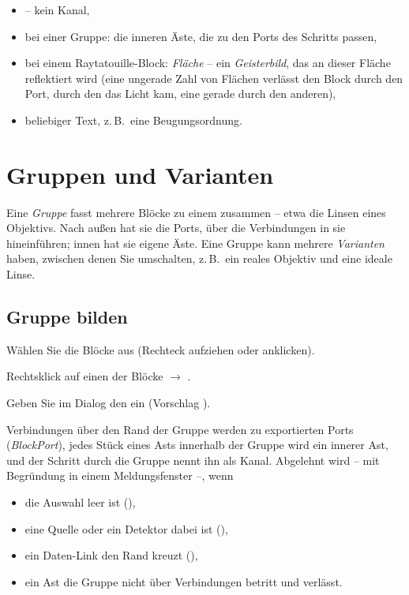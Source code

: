 \begin{itemize}
  \item {} – kein Kanal,
  \item bei einer Gruppe: die inneren Äste, die zu den Ports des Schritts passen,
  \item bei einem Raytatouille-Block: \textit{Fläche} – ein \emph{Geisterbild},
        das an dieser Fläche reflektiert wird (eine ungerade Zahl von Flächen verlässt den Block
        durch den Port, durch den das Licht kam, eine gerade durch den anderen),
  \item beliebiger Text, z.\,B.\ eine Beugungsordnung.
\end{itemize}

\section{Gruppen und Varianten}\label{sec:workflow-gruppen}

Eine \emph{Gruppe} fasst mehrere Blöcke zu einem zusammen – etwa die Linsen eines Objektivs. Nach
außen hat sie die Ports, über die Verbindungen in sie hineinführen; innen hat sie eigene Äste.
Eine Gruppe kann mehrere \emph{Varianten} haben, zwischen denen Sie umschalten, z.\,B.\ ein
reales Objektiv und eine ideale Linse.

\subsection{Gruppe bilden}

\begin{schritte}
  \item Wählen Sie die Blöcke aus (Rechteck aufziehen oder anklicken).
  \item Rechtsklick auf einen der Blöcke $\to$ .
  \item Geben Sie im Dialog  den  ein (Vorschlag
        ).
\end{schritte}

Verbindungen über den Rand der Gruppe werden zu exportierten Ports
(\textit{Block}\textit{Port}), jedes Stück eines Asts innerhalb der Gruppe wird ein
innerer Ast, und der Schritt durch die Gruppe nennt ihn als Kanal. Abgelehnt wird – mit
Begründung in einem Meldungsfenster –, wenn

\begin{itemize}
  \item die Auswahl leer ist (),
  \item eine Quelle oder ein Detektor dabei ist (),
  \item ein Daten-Link den Rand kreuzt (),
  \item ein Ast die Gruppe nicht über Verbindungen betritt und verlässt.
\end{itemize}

